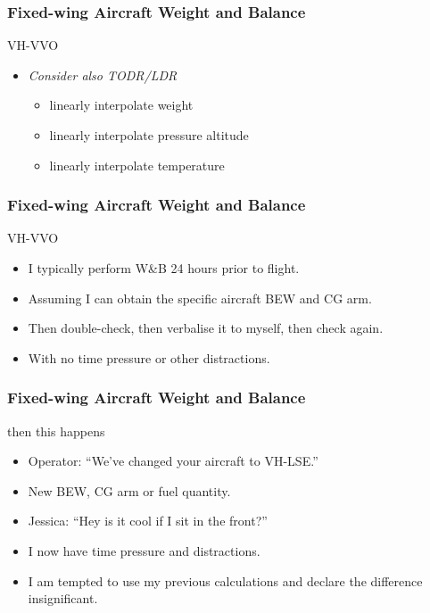 \begin{frame}
\frametitle{Fixed-wing Aircraft Weight and Balance}
\begin{block}{VH-VVO}
\begin{itemize}
\item \tiny{\emph{Consider also TODR/LDR}}
  \begin{itemize}
  \item \tiny{linearly interpolate weight}
  \item \tiny{linearly interpolate pressure altitude}
  \item \tiny{linearly interpolate temperature}
  \end{itemize}
\end{itemize}
\end{block}
\end{frame}

\begin{frame}
\frametitle{Fixed-wing Aircraft Weight and Balance}
\begin{block}{VH-VVO}
\begin{itemize}
\item<1-> I typically perform W\&B 24 hours prior to flight.
\item<2-> Assuming I can obtain the specific aircraft BEW and CG arm.
\item<3-> Then double-check, then verbalise it to myself, then check again.
\item<4-> With no time pressure or other distractions.
\end{itemize}
\end{block}
\end{frame}

\begin{frame}
\frametitle{Fixed-wing Aircraft Weight and Balance}
\begin{block}{then this happens}
\begin{itemize}
\item<1-> Operator: ``We've changed your aircraft to VH-LSE.''
\item<2-> New BEW, CG arm or fuel quantity.
\item<3-> Jessica: ``Hey is it cool if I sit in the front?''
\item<4-> I now have time pressure and distractions.
\item<5-> I am tempted to use my previous calculations and declare the difference insignificant.
\end{itemize}
\end{block}
\end{frame}

